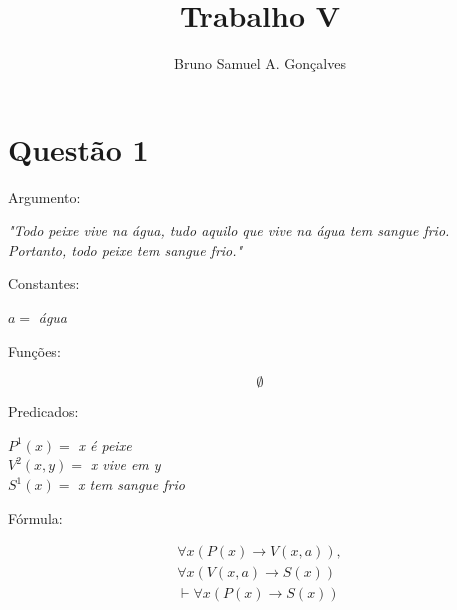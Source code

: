 \documentclass[12pt]{article}
\title{Trabalho V}
\author{Bruno Samuel A. Gonçalves}
\date{}
\begin{document}
\maketitle
\thispagestyle{empty}

\section{Questão 1}

\noindent Argumento:

\begin{center}
    \textit{"Todo peixe vive na água, tudo aquilo que vive na água tem sangue frio. Portanto, todo peixe tem sangue frio."}
\end{center}

\noindent Constantes:

\begin{center}
    $a =$ \textit{água}
\end{center}

\noindent Funções:

\[
    \emptyset
\]

\noindent Predicados:

\begin{center}
    $P^1(x) =$ \textit{x é peixe} \\
    $V^2(x, y) =$ \textit{x vive em y} \\
    $S^1(x) =$ \textit{x tem sangue frio}
\end{center}

\noindent Fórmula:

\begin{gather*}
    \forall x(P(x) \to V(x, a)), \\
    \forall x(V(x, a) \to S(x)) \\
    \vdash \forall x(P(x) \to S(x))
\end{gather*}
\end{document}
